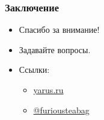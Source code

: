 \documentclass[xetex,mathserif,serif]{beamer}
\begin{document}
\begin{frame}
	\frametitle{Заключение}


    \begin{itemize}
        \item Спасибо за внимание!
        \item Задавайте вопросы.
    \end{itemize}

    \begin{itemize}
        \item Ссылки:
            \begin{itemize}
                \item \href{https://yarus.ru/}{yarus.ru}
                \item \href{https://t.me/furiousteabag}{@furiousteabag}
            \end{itemize}
    \end{itemize}


\end{frame}
\end{document}
